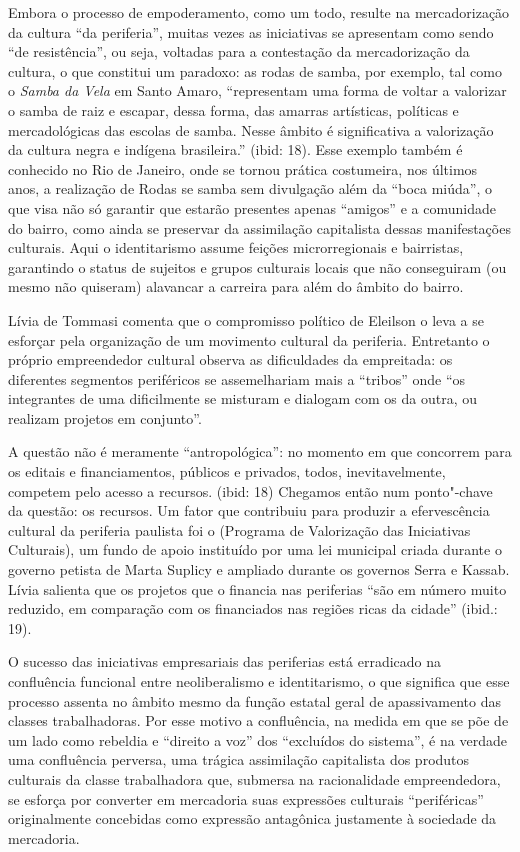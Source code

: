 Embora o processo de empoderamento, como um todo, resulte na
mercadorização da cultura ``da periferia'', muitas vezes as iniciativas
se apresentam como sendo ``de resistência'', ou seja, voltadas para a
contestação da mercadorização da cultura, o que constitui um paradoxo:
as rodas de samba, por exemplo, tal como o \emph{Samba da Vela} em Santo
Amaro, ``representam uma forma de voltar a valorizar o samba de raiz e
escapar, dessa forma, das amarras artísticas, políticas e mercadológicas
das escolas de samba. Nesse âmbito é significativa a valorização da
cultura negra e indígena brasileira.'' (ibid: 18). Esse exemplo também é
conhecido no Rio de Janeiro, onde se tornou prática costumeira, nos
últimos anos, a realização de Rodas se samba sem divulgação além da
``boca miúda'', o que visa não só garantir que estarão presentes apenas
``amigos'' e a comunidade do bairro, como ainda se preservar da
assimilação capitalista dessas manifestações culturais. Aqui o
identitarismo assume feições microrregionais e bairristas, garantindo o
status de sujeitos e grupos culturais locais que não conseguiram (ou
mesmo não quiseram) alavancar a carreira para além do âmbito do bairro.

Lívia de Tommasi comenta que o compromisso político de Eleilson o leva a
se esforçar pela organização de um movimento cultural da periferia.
Entretanto o próprio empreendedor cultural observa as dificuldades da
empreitada: os diferentes segmentos periféricos se assemelhariam mais a
``tribos'' onde ``os integrantes de uma dificilmente se misturam e
dialogam com os da outra, ou realizam projetos em conjunto''.

A questão não é meramente ``antropológica'': no momento em que concorrem
para os editais e financiamentos, públicos e privados, todos,
inevitavelmente, competem pelo acesso a recursos. (ibid: 18) Chegamos
então num ponto"-chave da questão: os recursos. Um fator que contribuiu
para produzir a efervescência cultural da periferia paulista foi o 
(Programa de Valorização das Iniciativas Culturais), um fundo de apoio
instituído por uma lei municipal criada durante o governo petista de
Marta Suplicy e ampliado durante os governos Serra e Kassab. Lívia
salienta que os projetos que o  financia nas periferias ``são em
número muito reduzido, em comparação com os financiados nas regiões
ricas da cidade'' (ibid.: 19).

O sucesso das iniciativas empresariais das periferias está erradicado na
confluência funcional entre neoliberalismo e identitarismo, o que
significa que esse processo assenta no âmbito mesmo da função estatal
geral de apassivamento das classes trabalhadoras. Por esse motivo a
confluência, na medida em que se põe de um lado como rebeldia e
``direito a voz'' dos ``excluídos do sistema'', é na verdade uma
confluência perversa, uma trágica assimilação capitalista dos produtos
culturais da classe trabalhadora que, submersa na racionalidade
empreendedora, se esforça por converter em mercadoria suas expressões
culturais ``periféricas'' originalmente concebidas como expressão
antagônica justamente à sociedade da mercadoria.

